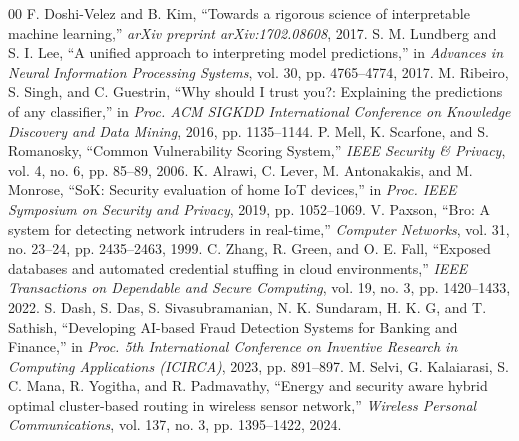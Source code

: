 \documentclass[conference]{IEEEtran}
\begin{document}
\begin{thebibliography}{00}
 F. Doshi-Velez and B. Kim, ``Towards a rigorous science of interpretable machine learning,'' \textit{arXiv preprint arXiv:1702.08608}, 2017.
 S. M. Lundberg and S. I. Lee, ``A unified approach to interpreting model predictions,'' in \textit{Advances in Neural Information Processing Systems}, vol. 30, pp. 4765--4774, 2017.
 M. Ribeiro, S. Singh, and C. Guestrin, ``Why should I trust you?: Explaining the predictions of any classifier,'' in \textit{Proc. ACM SIGKDD International Conference on Knowledge Discovery and Data Mining}, 2016, pp. 1135--1144.
 P. Mell, K. Scarfone, and S. Romanosky, ``Common Vulnerability Scoring System,'' \textit{IEEE Security \& Privacy}, vol. 4, no. 6, pp. 85--89, 2006.
 K. Alrawi, C. Lever, M. Antonakakis, and M. Monrose, ``SoK: Security evaluation of home IoT devices,'' in \textit{Proc. IEEE Symposium on Security and Privacy}, 2019, pp. 1052--1069.
 V. Paxson, ``Bro: A system for detecting network intruders in real-time,'' \textit{Computer Networks}, vol. 31, no. 23--24, pp. 2435--2463, 1999.
 C. Zhang, R. Green, and O. E. Fall, ``Exposed databases and automated credential stuffing in cloud environments,'' \textit{IEEE Transactions on Dependable and Secure Computing}, vol. 19, no. 3, pp. 1420--1433, 2022.
 S. Dash, S. Das, S. Sivasubramanian, N. K. Sundaram, H. K. G, and T. Sathish, ``Developing AI-based Fraud Detection Systems for Banking and Finance,'' in \textit{Proc. 5th International Conference on Inventive Research in Computing Applications (ICIRCA)}, 2023, pp. 891--897.
 M. Selvi, G. Kalaiarasi, S. C. Mana, R. Yogitha, and R. Padmavathy, ``Energy and security aware hybrid optimal cluster-based routing in wireless sensor network,'' \textit{Wireless Personal Communications}, vol. 137, no. 3, pp. 1395--1422, 2024.
\end{thebibliography}
\end{document}
